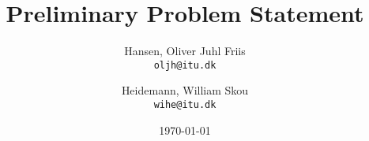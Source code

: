 \usepackage{graphicx}
\usepackage{float}
\usepackage{caption}
\usepackage{url}
\usepackage{enumitem}
\usepackage{amsmath} %
\usepackage{wrapfig} %
\usepackage[utf8]{inputenc}
\usepackage{fancyvrb}
\usepackage{listings}

\usepackage{hyperref}
\hypersetup{
    colorlinks=true,
    linkcolor=blue,
    filecolor=magenta,      
    urlcolor=cyan,
}

\title{Preliminary Problem Statement}
\author{
Hansen, Oliver Juhl Friis\\
\texttt{oljh@itu.dk}
\and
Heidemann, William Skou\\
\texttt{wihe@itu.dk}
}
\date{\today}
